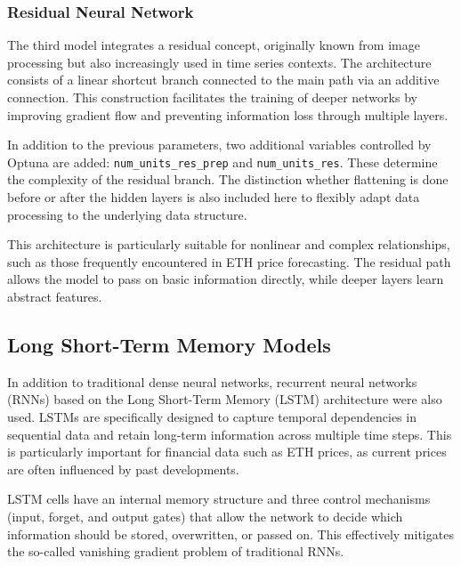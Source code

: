 

\subsubsection{Residual Neural Network}

The third model integrates a residual concept, originally known from image processing but also increasingly used in time series contexts. The architecture consists of a linear shortcut branch connected to the main path via an additive connection. This construction facilitates the training of deeper networks by improving gradient flow and preventing information loss through multiple layers.

In addition to the previous parameters, two additional variables controlled by Optuna are added: \verb|num_units_res_prep| and \verb|num_units_res|. These determine the complexity of the residual branch. The distinction whether flattening is done before or after the hidden layers is also included here to flexibly adapt data processing to the underlying data structure.

This architecture is particularly suitable for nonlinear and complex relationships, such as those frequently encountered in ETH price forecasting. The residual path allows the model to pass on basic information directly, while deeper layers learn abstract features.



\subsection{Long Short-Term Memory Models}

In addition to traditional dense neural networks, recurrent neural networks (RNNs) based on the Long Short-Term Memory (LSTM) architecture were also used. LSTMs are specifically designed to capture temporal dependencies in sequential data and retain long-term information across multiple time steps. This is particularly important for financial data such as ETH prices, as current prices are often influenced by past developments.

LSTM cells have an internal memory structure and three control mechanisms (input, forget, and output gates) that allow the network to decide which information should be stored, overwritten, or passed on. This effectively mitigates the so-called vanishing gradient problem of traditional RNNs.

